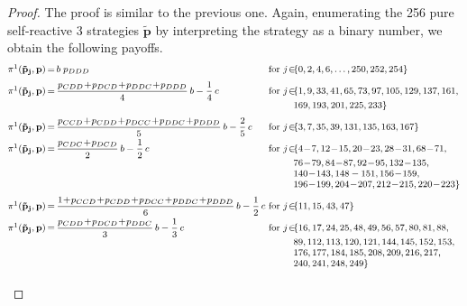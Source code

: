 \documentclass[9pt,twoside,lineno]{pnas-new}
\theoremstyle{plainCl1}
\theoremstyle{plainCl2}
\begin{document}
\begin{proof}
The proof is similar to the previous one. 
Again, enumerating the 256 pure self-reactive 3 strategies $\mathbf{\tilde p}$ by interpreting the strategy as a binary number, we obtain the following payoffs. 
\begin{equation*}\label{Eq:PayoffExpressionsReactiveThree}
\footnotesize
\setlength{\arraycolsep}{0mm}
\begin{array}{lclll}
\pi^1(\mathbf{\tilde p_j},\mathbf{p}) &{\, = \,}
&\displaystyle b \; p_{DDD} 
&~\text{for}~ j\! \in\! 
&\{0, 2, 4, 6, \dots, 250, 252, 254\} \\[0.2cm]

\pi^1(\mathbf{\tilde p_j},\mathbf{p}) &= 
&\displaystyle \frac{p_{CDD} \!+\! p_{DCD}\!+\!  p_{DDC} \!+\!  p_{DDD}}{4}\,b - \frac{1}{4}\,c 
&~\text{for}~ j\! \in\!  
& \{ 1, 9, 33, 41, 65, 73, 97, 105, 129, 137, 161,
	\\ & & &  &169, 193, 201, 225, 233\} \\[0.2cm]
    
\pi^1(\mathbf{\tilde p_j},\mathbf{p}) &= 
&\displaystyle \frac{p_{CCD} \!+\! p_{CDD} \!+\! p_{DCC} \!+\! p_{DDC} \!+\! p_{DDD}}{5}\,b - \frac{2}{5} \, c &~\text{for}~ j\! \in\!  
& \{ 3, 7, 35, 39, 131, 135, 163, 167\} \\[0.2cm]

\pi^1(\mathbf{\tilde p_j},\mathbf{p}) &= 
&\displaystyle \frac{p_{CDC} \!+\! p_{DCD}}{2}\,b - \frac{1}{2} \, c 
&~\text{for}~ j\! \in\!  
& \{ 4 \!- \!7, 12 \!- \!15, 20 \!- \!23, 28 \!- \!31, 68 \!- \!71,
    \\ & & &  &76 \!- \!79, 84 \!- \!87, 92 \!- \!95, 132 \!- \!135, 
    \\ & & & &140 \!- \!143, 148- 151, 156 \!- \!159, 
    \\ & & & &196 \!- \!199, 204 \!- \!207, 212 \!- \!215, 220 \!- \!223\} \\[0.2cm]
    
\pi^1(\mathbf{\tilde p_j},\mathbf{p}) &= 
&\displaystyle \frac{1\!+\!p_{CCD} \!+\! p_{CDD} \!+\! p_{DCC} \!+\! p_{DDC} \!+\! p_{DDD}}{6}\,b - \frac{1}{2} \, c 
&~\text{for}~ j\! \in\! 
& \{ 11, 15, 43, 47\} \\ [0.2cm]

\pi^1(\mathbf{\tilde p_j},\mathbf{p}) &= 
&\displaystyle \frac{p_{CDD} \!+\! p_{DCD} \!+\! p_{DDC}}{3}\,b - \frac{1}{3} \, c 
&~\text{for}~ j\! \in\! 
& \{16,17,24,25,48,49,56,57,80,81,88,
    \\ & & & &89,112, 113,120,121, 144,145,152,153,
    \\ & & & &176,177,184,185,208,209,216,217,
    \\ & & & &240, 241,248,249\} \\[0.2cm]
    

\end{array}
\end{equation*}
\end{proof}
\end{document}
